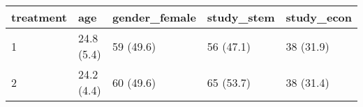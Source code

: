 
\begin{tabular}{l|l|l|l|l}
\hline
treatment & age & gender\_female & study\_stem & study\_econ\\
\hline
1 & 24.8 (5.4) & 59 (49.6) & 56 (47.1) & 38 (31.9)\\
\hline
2 & 24.2 (4.4) & 60 (49.6) & 65 (53.7) & 38 (31.4)\\
\hline
\end{tabular}
